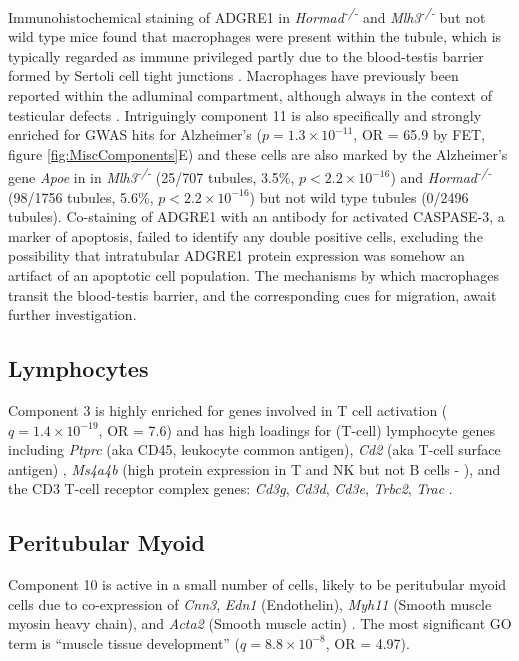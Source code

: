 Immunohistochemical staining of ADGRE1 in \textit{Hormad\textsuperscript{-/-}} and \textit{Mlh3\textsuperscript{-/-}} but not wild type mice found that macrophages were present within the tubule, which is typically regarded as immune privileged partly due to the blood-testis barrier formed by Sertoli cell tight junctions \parencite{Fijak2006testis}. Macrophages have previously been reported within the adluminal compartment, although always in the context of testicular defects \parencite{Frungieri2002Number, Goluza2014Macrophages}. Intriguingly component 11 is also specifically and strongly enriched for GWAS hits for Alzheimer's ($p = 1.3\times10^{-11}$, OR = 65.9 by FET, figure \ref{fig:MiscComponents}E) and these cells are also marked by the Alzheimer's gene \textit{Apoe} in in \textit{Mlh3\textsuperscript{-/-}} (25/707 tubules, 3.5\%, $p<2.2\times10^{-16}$) and \textit{Hormad\textsuperscript{-/-}} (98/1756 tubules, 5.6\%, $p<2.2\times10^{-16}$) but not wild type tubules (0/2496 tubules). Co-staining of ADGRE1 with an antibody for activated CASPASE-3, a marker of apoptosis, failed to identify any double positive cells, excluding the possibility that intratubular ADGRE1 protein expression was somehow an artifact of an apoptotic cell population. The mechanisms by which macrophages transit the blood-testis barrier, and the corresponding cues for migration, await further investigation.


\subsection{Lymphocytes}
Component 3 is highly enriched for genes involved in T cell activation ($q = 1.4\times10^{-19}$, OR = 7.6) and has high loadings for (T-cell) lymphocyte genes including \textit{Ptprc} (aka CD45, leukocyte common antigen), \textit{Cd2} (aka T-cell surface antigen) \parencite{Murray2011Protective, Murphy2012Janeway}, \textit{Ms4a4b} (high protein expression in T and NK but not B cells - \cite{Xu2010MS4a4B}), and the CD3 T-cell receptor complex genes: \textit{Cd3g}, \textit{Cd3d}, \textit{Cd3e}, \textit{Trbc2}, \textit{Trac} \parencite{Call2002Organizing}.


\subsection{Peritubular Myoid}

Component 10 is active in a small number of cells, likely to be peritubular myoid cells due to co-expression of \textit{Cnn3}, \textit{Edn1} (Endothelin), \textit{Myh11} (Smooth muscle myosin heavy chain), and \textit{Acta2} (Smooth muscle actin) \parencite{Mayerhofer2013Human}. The most significant GO term is ``muscle tissue development'' ($q = 8.8\times10^{-8}$, OR = 4.97).



